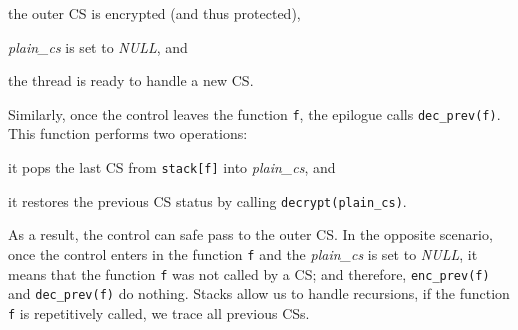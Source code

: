 \begin{enumerate*}[label=(\roman*)]
	\item the outer CS is encrypted (and thus protected),
	\item \emph{plain\_cs} is set to \emph{NULL}, and
	\item the thread is ready to handle a new CS.
\end{enumerate*}
Similarly, once the control leaves the function \texttt{f}, the epilogue calls 
\texttt{dec\_prev(f)}.
This function performs two operations:
\begin{enumerate*}[label=(\roman*)]
	\item it pops the last CS from \texttt{stack[f]} into \emph{plain\_cs}, and
	\item it restores the previous CS status by calling 
	\texttt{decrypt(plain\_cs)}.
\end{enumerate*}
As a result, the control can safe pass to the outer CS.
In the opposite scenario, once the control enters in the function \texttt{f} 
and the \emph{plain\_cs} is set to \emph{NULL}, it means that the function 
\texttt{f} was not called by a CS; and therefore, \texttt{enc\_prev(f)} and 
\texttt{dec\_prev(f)} do nothing.
Stacks allow us to handle recursions, if the function \texttt{f} is 
repetitively called, we trace all previous CSs.



